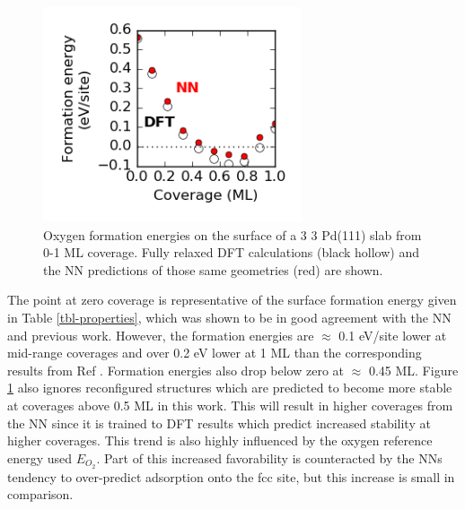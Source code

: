 \documentclass[12pt]{cmuthesis}
\begin{document}
\begin{figure}[htbp]
\centering
\includegraphics[width=3in]{./images/formation-energy.png}
\caption{\label{fig-formation-energy}
Oxygen formation energies on the surface of a 3 \texttimes{} 3 Pd(111) slab from 0-1 ML coverage. Fully relaxed DFT calculations (black hollow) and the NN predictions of those same geometries (red) are shown.}
\end{figure}

The point at zero coverage is representative of the surface formation energy given in Table \ref{tbl-properties}, which was shown to be in good agreement with the NN and previous work. However, the formation energies are \(\approx\) 0.1 eV/site lower at mid-range coverages and over 0.2 eV lower at 1 ML than the corresponding results from Ref . Formation energies also drop below zero at \(\approx\) 0.45 ML. Figure \ref{fig-formation-energy} also ignores reconfigured structures which are predicted to become more stable at coverages above 0.5 ML in this work. This will result in higher coverages from the NN since it is trained to DFT results which predict increased stability at higher coverages. This trend is also highly influenced by the oxygen reference energy used \(E_{O_{2}}\). Part of this increased favorability is counteracted by the NNs tendency to over-predict adsorption onto the fcc site, but this increase is small in comparison.
\end{document}
